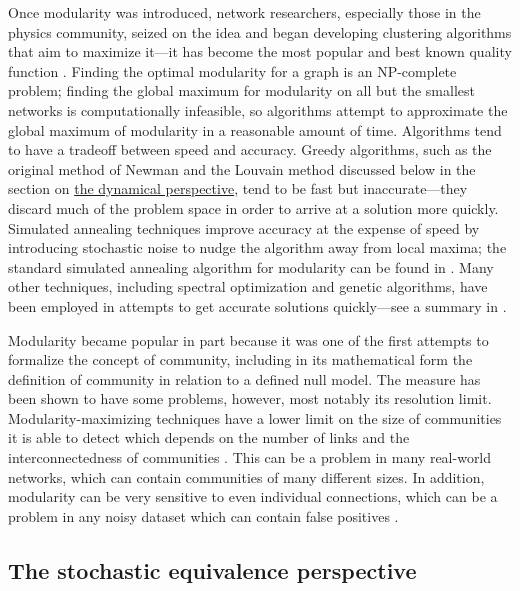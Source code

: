 Once modularity was introduced, network researchers, especially those in
the physics community, seized on the idea and began developing
clustering algorithms that aim to maximize it---it has become the most
popular and best known quality function
\autocite{fortunato_community_2010}. Finding the optimal modularity for
a graph is an NP-complete problem; finding the global maximum for
modularity on all but the smallest networks is computationally
infeasible, so algorithms attempt to approximate the global maximum of
modularity in a reasonable amount of time. Algorithms tend to have a
tradeoff between speed and accuracy. Greedy algorithms, such as the
original method of Newman \autocite{newman_fast_2004} and the Louvain
method \autocite{blondel_fast_2008} discussed below in the section on
\protect\hyperlink{the-dynamical-perspective}{the dynamical
perspective}, tend to be fast but inaccurate---they discard much of the
problem space in order to arrive at a solution more quickly. Simulated
annealing techniques improve accuracy at the expense of speed by
introducing stochastic noise to nudge the algorithm away from local
maxima; the standard simulated annealing algorithm for modularity can be
found in \autocite{guimera_functional_2005}. Many other techniques,
including spectral optimization and genetic algorithms, have been
employed in attempts to get accurate solutions quickly---see a summary
in \autocite{fortunato_community_2010}.

Modularity became popular in part because it was one of the first
attempts to formalize the concept of community, including in its
mathematical form the definition of community in relation to a defined
null model. The measure has been shown to have some problems, however,
most notably its resolution limit. Modularity-maximizing techniques have
a lower limit on the size of communities it is able to detect which
depends on the number of links and the interconnectedness of communities
\autocite{fortunato_resolution_2007}. This can be a problem in many
real-world networks, which can contain communities of many different
sizes. In addition, modularity can be very sensitive to even individual
connections, which can be a problem in any noisy dataset which can
contain false positives \autocite{fortunato_community_2010}.

\hypertarget{the-stochastic-equivalence-perspective}{\subsection{The
stochastic equivalence
perspective}\label{the-stochastic-equivalence-perspective}}

